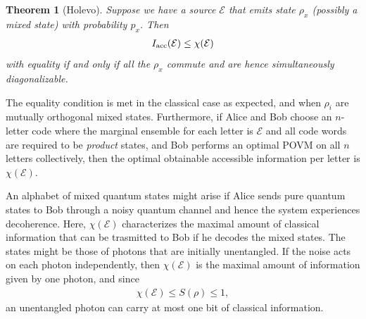 \documentclass[a4paper, 12pt]{article}
\numberwithin{equation}{section}
\numberwithin{figure}{section}
\newtheorem{theorem}{Theorem}[section]
\theoremstyle{definition}
\begin{document}
    \begin{theorem}[Holevo]
        Suppose we have a source $\mathcal{E}$ that emits state $\rho_x$ (possibly a mixed state) with probability $p_x$. Then
        \begin{align}
            I_{\textnormal{acc}}(\mathcal{E}) \leq \chi(\mathcal{E})
        \end{align}
        with equality if and only if all the $\rho_x$ commute and are hence simultaneously diagonalizable.
    \end{theorem}
    The equality condition is met in the classical case as expected, and when $\rho_i$ are mutually orthogonal mixed states. Furthermore, if Alice and Bob choose an $n$-letter code where the marginal ensemble for each letter is $\mathcal{E}$ and all code words are required to be \textit{product} states, and Bob performs an optimal POVM on all $n$ letters collectively, then the optimal obtainable accessible information per letter is $\chi(\mathcal{E})$. \par
    An alphabet of mixed quantum states might arise if Alice sends pure quantum states to Bob through a noisy quantum channel and hence the system experiences decoherence. Here, $\chi(\mathcal{E})$ characterizes the maximal amount of classical information that can be trasmitted to Bob if he decodes the mixed states. The states might be those of photons that are initially unentangled. If the noise acts on each photon independently, then $\chi(\mathcal{E})$ is the maximal amount of information given by one photon, and since
    \begin{align}
        \chi(\mathcal{E}) \leq S(\rho) \leq 1,
    \end{align}
    an unentangled photon can carry at most one bit of classical information.
\end{document}
